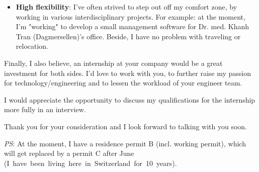 \documentclass[11pt, a4paper]{awesome-cv}
\begin{document}
\begin{cvletter}
\begin{itemize}[leftmargin=*]

	\item \textbf{High flexibility}: I've often strived to step out off my comfort zone, by working in various interdisciplinary projects. For example: at the moment, I'm "working" to develop a small management software for Dr. med. Khanh Tran (Dagmersellen)'s office. Beside, I have no problem with traveling or relocation.   
\end{itemize}


Finally, I also believe, an internship at your company would be a great investment for both sides.  I'd love to work with you, to further raise my passion for technology/engineering and to lessen the workload of your engineer team. 


I would appreciate the opportunity to discuss my qualifications for the internship more fully in an interview.  

Thank you for your consideration and I look forward to talking with you soon. 

\end{cvletter}

\makeletterclosing

\textit{PS}: At the moment, I have a residence permit B (incl. working permit), which will get replaced by a permit C after June \mbox{(I have been living here in Switzerland for 10 years).} 
\end{document}
